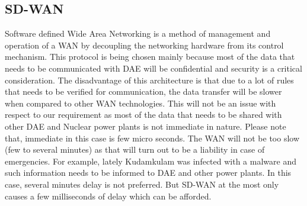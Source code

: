 \documentclass{article}
\begin{document}
\subsection{SD-WAN}
Software defined Wide Area Networking is a method of management and operation of a WAN by decoupling the networking hardware from its control mechanism. This protocol is being chosen mainly because most of the data that needs to be communicated with DAE will be confidential and security is a critical consideration. The disadvantage of this architecture is that due to a lot of rules that needs to be verified for communication, the data transfer will be slower when compared to other WAN technologies. This will not be an issue with respect to our requirement as most of the data that needs to be shared with other DAE and Nuclear power plants is not immediate in nature. Please note that, immediate in this case is few micro seconds. The WAN will not be too slow (few to several minutes) as that will turn out to be a liability in case of emergencies. For example, lately Kudamkulam was infected with a malware and such information needs to be informed to DAE and other power plants. In this case, several minutes delay is not preferred. But SD-WAN at the most only causes a few milliseconds of delay which can be afforded.
\end{document}
